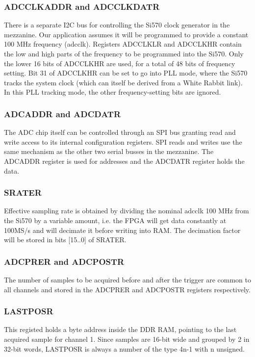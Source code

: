 \documentclass{article}
\begin{document}
\subsubsection{ADCCLKADDR and ADCCLKDATR}
\label{ss:adcclk}
There is a separate I2C bus for controlling the Si570 clock generator in the mezzanine. Our application assumes it will be programmed to provide a constant 100 MHz frequency (adcclk). Registers ADCCLKLR and ADCCLKHR contain the low and high parts of the frequency to be programmed into the Si570. Only the lower 16 bits of ADCCLKHR are used, for a total of 48 bits of frequency setting. Bit 31 of ADCCLKHR can be set to go into PLL mode, where the Si570 tracks the system clock (which can itself be derived from a White Rabbit link). In this PLL tracking mode, the other frequency-setting bits are ignored.

\subsubsection{ADCADDR and ADCDATR}
The ADC chip itself can be controlled through an SPI bus granting read and write access to its internal configuration registers. SPI reads and writes use the same mechanism as the other two serial busses in the mezzanine. The ADCADDR register is used for addresses and the ADCDATR register holds the data.

\subsubsection{SRATER}
Effective sampling rate is obtained by dividing the nominal adcclk 100 MHz from the Si570 by a variable amount, i.e. the FPGA will get data constantly at 100MS/s and will decimate it before writing into RAM. The decimation factor will be stored in bits [15..0] of SRATER.

\subsubsection{ADCPRER and ADCPOSTR}
The number of samples to be acquired before and after the trigger are common to all channels and stored in the ADCPRER and ADCPOSTR registers respectively.

\subsubsection{LASTPOSR}
This registed holds a byte address inside the DDR RAM, pointing to the last acquired sample for channel 1. Since samples are 16-bit wide and grouped by 2 in 32-bit words, LASTPOSR is always a number of the type 4n-1 with n unsigned.
\end{document}
